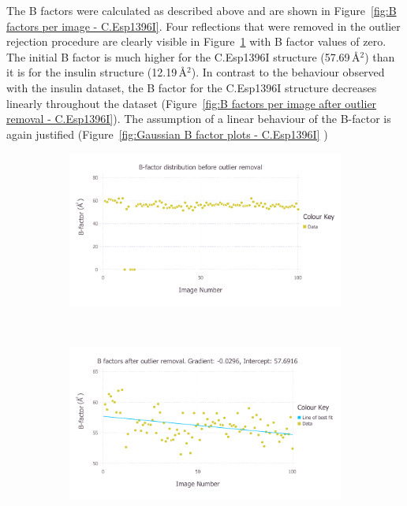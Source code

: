 The B factors were calculated as described above and are shown in Figure~\ref{fig:B factors per image - C.Esp1396I}.
Four reflections that were removed in the outlier rejection procedure are clearly visible in Figure~\ref{fig:B factors per image before outlier removal - C.Esp1396I} with B factor values of zero.
The initial B factor is much higher for the C.Esp1396I structure (57.69$\,$\AA$^2$) than it is for the insulin structure (12.19$\,$\AA$^2$).
In contrast to the behaviour observed with the insulin dataset, the B factor for the C.Esp1396I structure decreases linearly throughout the dataset (Figure~\ref{fig:B factors per image after outlier removal - C.Esp1396I}).
The assumption of a linear behaviour of the B-factor is again justified (Figure~\ref{fig:Gaussian B factor plots - C.Esp1396I} )
\begin{figure}
    \centering
    \begin{subfigure}[b]{1.0\textwidth}
            \centering
            \includegraphics[width=\textwidth]{figures/datared/BFac_Plot_Before_outlier_removal_cprot.pdf}
            \caption{}
            \label{fig:B factors per image before outlier removal - C.Esp1396I}
    \end{subfigure}
    \\
    \begin{subfigure}[b]{1.0\textwidth}
            \centering
            \includegraphics[width=\textwidth]{figures/datared/BFac_Plot_After_outlier_removal_cprot.pdf}

\end{subfigure}
\end{figure}
